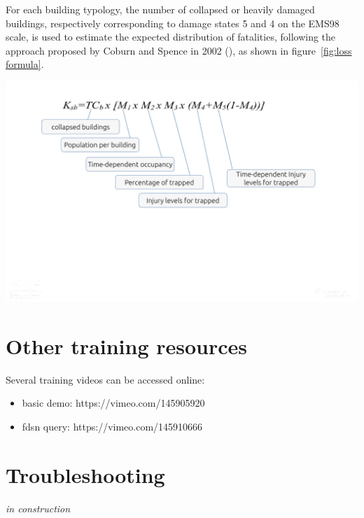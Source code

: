 \documentclass[12p]{article}
\begin{document}
For each building typology, the number of collapsed or heavily damaged
buildings, respectively corresponding to damage states 5 and 4 on the EMS98
scale, is used to estimate the expected distribution of fatalities, following
the approach proposed by Coburn and Spence in 2002
(\cite{coburn_earthquake_2002}), as shown in figure~\ref{fig:loss formula}.   

\begin{center}
	\includegraphics[trim=0mm 60mm 30mm
0mm,clip,width=\textwidth]{loss_formula}
\end{center}


%
%

\newpage
\section{Other training resources}
\label{sec:training resources}

Several training videos can be accessed online:
\begin{itemize}
	\item{basic demo: https://vimeo.com/145905920}
	\item{fdsn query: https://vimeo.com/145910666}
\end{itemize}

\newpage
\section{Troubleshooting}
\emph{in construction}



\end{document}
